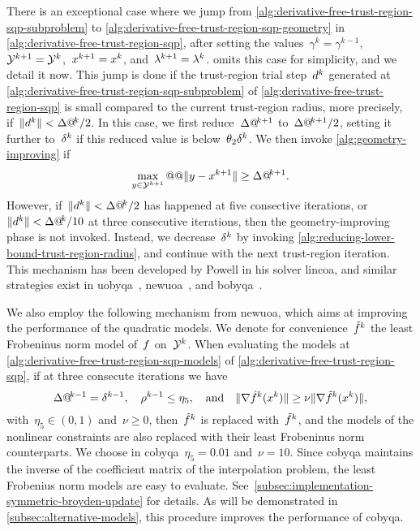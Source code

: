 There is an exceptional case where we jump from \cref{alg:derivative-free-trust-region-sqp-subproblem} to \cref{alg:derivative-free-trust-region-sqp-geometry} in \cref{alg:derivative-free-trust-region-sqp}, after setting the values~$\gamma^k = \gamma^{k - 1}$,~$\xpt[k + 1] = \xpt[k]$,~$\iter[k + 1] = \iter[k]$, and~$\lm[k + 1] = \lm[k]$.
 omits this case for simplicity, and we detail it now.
This jump is done if the trust-region trial step~$\step[k]$ generated at \cref{alg:derivative-free-trust-region-sqp-subproblem} of \cref{alg:derivative-free-trust-region-sqp} is small compared to the current trust-region radius, more precisely, if~$\norm{\step[k]} < \rad[k] / 2$.
In this case, we first reduce~$\rad[k + 1]$ to~$\rad[k + 1] / 2$, setting it further to~$\radlb[k]$ if this reduced value is below~$\theta_2 \radlb[k]$.
We then invoke \cref{alg:geometry-improving} if
\begin{equation*}
    \max_{y \in \xpt[k + 1]} @@ \norm{y - \iter[k + 1]} \ge \rad[k + 1].
\end{equation*}
However, if~$\norm{\step[k]} < \rad[k] / 2$ has happened at five consective iterations, or~$\norm{\step[k]} < \rad[k] / 10$ at three consecutive iterations, then the geometry-improving phase is not invoked.
Instead, we decrease~$\radlb[k]$ by invoking \cref{alg:reducing-lower-bound-trust-region-radius}, and continue with the next trust-region iteration.
This mechanism has been developed by Powell in his solver \gls{lincoa}, and similar strategies exist in \gls{uobyqa}~\cite{Powell_2002}, \gls{newuoa}~\cite{Powell_2006}, and \gls{bobyqa}~\cite{Powell_2009}.

We also employ the following mechanism from \gls{newuoa}, which aims at improving the performance of the quadratic models.
We denote for convenience~$\objmalt[k]$ the least Frobeninus norm model of~$f$ on~$\xpt[k]$.
When evaluating the models at \cref{alg:derivative-free-trust-region-sqp-models} of \cref{alg:derivative-free-trust-region-sqp}, if at three consecute iterations we have
\begin{equation*}
    \rad[k - 1] = \radlb[k - 1], \quad \ratio[k - 1] \le \eta_5, \quad \text{and} \quad \norm{\nabla \objm[k](\iter[k])} \ge \nu \norm{\nabla \objmalt[k](\iter[k])},
\end{equation*}
with~$\eta_5 \in (0, 1)$ and~$\nu \ge 0$, then~$\objm[k]$ is replaced with~$\objmalt[k]$, and the models of the nonlinear constraints are also replaced with their least Frobeninus norm counterparts.
We choose in \gls{cobyqa}~$\eta_5 = 0.01$ and~$\nu = 10$.
Since \gls{cobyqa} maintains the inverse of the coefficient matrix of the interpolation problem, the least Frobenius norm models are easy to evaluate.
See~\cref{subsec:implementation-symmetric-broyden-update} for details.
As will be demonstrated in \cref{subsec:alternative-models}, this procedure improves the performance of \gls{cobyqa}.

